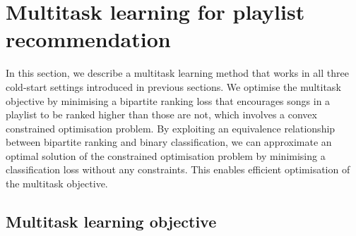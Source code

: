 \section{Multitask learning for playlist recommendation}
\label{sec:method}

In this section, 
we describe a multitask learning method that works in all three cold-start settings introduced in previous sections.
We optimise the multitask objective by minimising a bipartite ranking loss that encourages songs in a playlist
to be ranked higher than those are not, which involves a convex constrained optimisation problem.
By exploiting an equivalence relationship between bipartite ranking and binary classification, 
we can approximate an optimal solution of the constrained optimisation problem by minimising a classification loss without any constraints.
This enables efficient optimisation of the multitask objective.







\subsection{Multitask learning objective}

